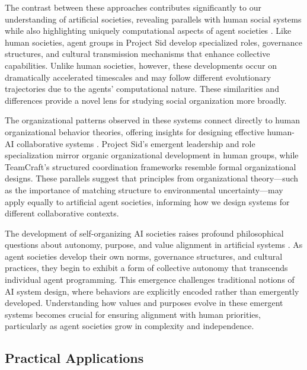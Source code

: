 \documentclass[a4paper, 12pt]{article}
\begin{document}
The contrast between these approaches contributes significantly to our understanding of artificial societies, revealing parallels with human social systems while also highlighting uniquely computational aspects of agent societies \autocite{al2024projectsidmanyagentsimulations,long2024teamcraftbenchmarkmultimodalmultiagent}. Like human societies, agent groups in Project Sid develop specialized roles, governance structures, and cultural transmission mechanisms that enhance collective capabilities. Unlike human societies, however, these developments occur on dramatically accelerated timescales and may follow different evolutionary trajectories due to the agents' computational nature. These similarities and differences provide a novel lens for studying social organization more broadly.

The organizational patterns observed in these systems connect directly to human organizational behavior theories, offering insights for designing effective human-AI collaborative systems \autocite{chen2024sagentsselforganizingagentsopenended,Lhaksmana2018RoleBasedMF}. Project Sid's emergent leadership and role specialization mirror organic organizational development in human groups, while TeamCraft's structured coordination frameworks resemble formal organizational designs. These parallels suggest that principles from organizational theory---such as the importance of matching structure to environmental uncertainty---may apply equally to artificial agent societies, informing how we design systems for different collaborative contexts.

The development of self-organizing AI societies raises profound philosophical questions about autonomy, purpose, and value alignment in artificial systems \autocite{al2024projectsidmanyagentsimulations}. As agent societies develop their own norms, governance structures, and cultural practices, they begin to exhibit a form of collective autonomy that transcends individual agent programming. This emergence challenges traditional notions of AI system design, where behaviors are explicitly encoded rather than emergently developed. Understanding how values and purposes evolve in these emergent systems becomes crucial for ensuring alignment with human priorities, particularly as agent societies grow in complexity and independence.

\subsection{Practical Applications}
\end{document}
